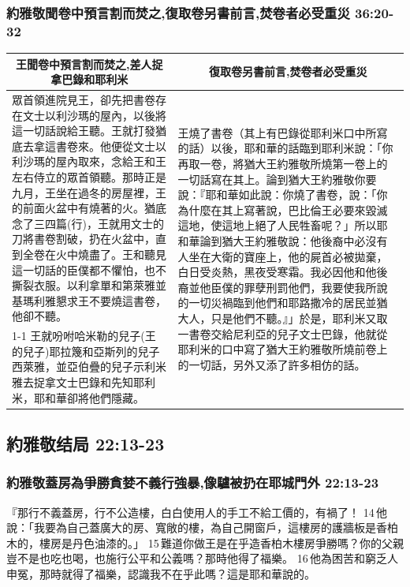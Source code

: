 \subsubsection{約雅敬聞卷中預言割而焚之,復取卷另書前言,焚卷者必受重災 36:20-32}
\begin{table}[H]
\centering
\begin{tabular}{p{8.5cm}|p{9.0cm}}\hline\hline
\multicolumn{1}{c|}{王聞卷中預言割而焚之,差人捉拿巴錄和耶利米}&\multicolumn{1}{c}{復取卷另書前言,焚卷者必受重災}\\\hline
眾首領進院見王，卻先把書卷存在文士以利沙瑪的屋內，以後將這一切話說給王聽。王就打發猶底去拿這書卷來。他便從文士以利沙瑪的屋內取來，念給王和王左右侍立的眾首領聽。那時正是九月，王坐在過冬的房屋裡，王的前面火盆中有燒著的火。猶底念了三四篇(行)，王就用文士的刀將書卷割破，扔在火盆中，直到全卷在火中燒盡了。王和聽見這一切話的臣僕都不懼怕，也不撕裂衣服。以利拿單和第萊雅並基瑪利雅懇求王不要燒這書卷，他卻不聽。
&\multirow{2}{9.4cm}{王燒了書卷（其上有巴錄從耶利米口中所寫的話）以後，耶和華的話臨到耶利米說：「你再取一卷，將猶大王約雅敬所燒第一卷上的一切話寫在其上。論到猶大王約雅敬你要說：『耶和華如此說：你燒了書卷，說：「你為什麼在其上寫著說，巴比倫王必要來毀滅這地，使這地上絕了人民牲畜呢？」所以耶和華論到猶大王約雅敬說：他後裔中必沒有人坐在大衛的寶座上，他的屍首必被拋棄，白日受炎熱，黑夜受寒霜。我必因他和他後裔並他臣僕的罪孽刑罰他們，我要使我所說的一切災禍臨到他們和耶路撒冷的居民並猶大人，只是他們不聽。』」於是，耶利米又取一書卷交給尼利亞的兒子文士巴錄，他就從耶利米的口中寫了猶大王約雅敬所燒前卷上的一切話，另外又添了許多相仿的話。}\\\cline{1-1}
王就吩咐哈米勒的兒子(王的兒子)耶拉篾和亞斯列的兒子西萊雅，並亞伯疊的兒子示利米雅去捉拿文士巴錄和先知耶利米，耶和華卻將他們隱藏。
&\\\hline
\end{tabular}
\end{table}
 
\subsection{約雅敬结局 22:13-23}
\subsubsection{約雅敬蓋房為爭勝貪婪不義行強暴,像驢被扔在耶城門外 22:13-23}
『那行不義蓋房，行不公造樓，白白使用人的手工不給工價的，有禍了！ 14 他說：「我要為自己蓋廣大的房、寬敞的樓，為自己開窗戶，這樓房的護牆板是香柏木的，樓房是丹色油漆的。」 15 難道你做王是在乎造香柏木樓房爭勝嗎？你的父親豈不是也吃也喝，也施行公平和公義嗎？那時他得了福樂。 16 他為困苦和窮乏人申冤，那時就得了福樂，認識我不在乎此嗎？這是耶和華說的。

